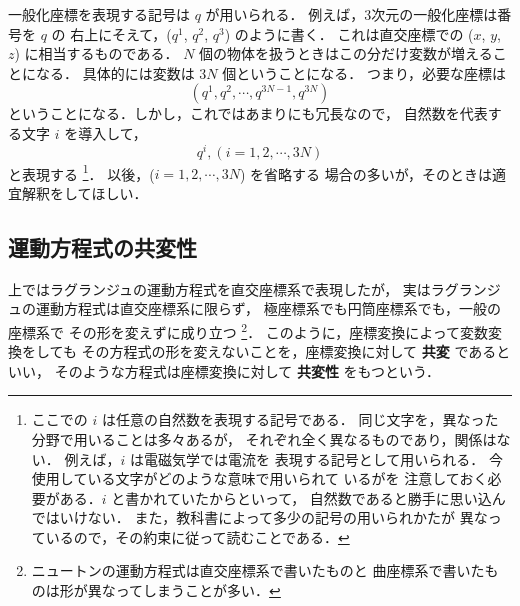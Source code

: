             一般化座標を表現する記号は $q$ が用いられる．
            例えば，3次元の一般化座標は番号を $q$ の
            右上にそえて，($q^{1}$, $q^{2}$, $q^{3}$) のように書く．
            これは直交座標での ($x$, $y$, $z$) に相当するものである．
            $N$ 個の物体を扱うときはこの分だけ変数が増えることになる．
            具体的には変数は $3N$ 個ということになる．
            つまり，必要な座標は
            \begin{equation*}
                (q^{1}, q^{2}, \cdots , q^{3N-1}, q^{3N})
            \end{equation*}
            ということになる．しかし，これではあまりにも冗長なので，
            自然数を代表する文字 $i$ を導入して，
            \begin{equation*}
                q^{i} , (i=1, 2, \cdots, 3N)
            \end{equation*}
            と表現する
                \footnote{
                    ここでの $i$ は任意の自然数を表現する記号である．
                    同じ文字を，異なった分野で用いることは多々あるが，
                    それぞれ全く異なるものであり，関係はない．
                    例えば，$i$ は電磁気学では電流を
                    表現する記号として用いられる．
                    今使用している文字がどのような意味で用いられて
                    いるがを
                    注意しておく必要がある．$i$ と書かれていたからといって，
                    自然数であると勝手に思い込んではいけない．
                    また，教科書によって多少の記号の用いられかたが
                    異なっているので，その約束に従って読むことである．
                }．
            以後，($i=1, 2, \cdots, 3N$) を省略する
            場合の多いが，そのときは適宜解釈をしてほしい．

        \subsection{運動方程式の共変性}
            上ではラグランジュの運動方程式を直交座標系で表現したが，
            実はラグランジュの運動方程式は直交座標系に限らず，
            極座標系でも円筒座標系でも，一般の座標系で
            その形を変えずに成り立つ
                \footnote{
                    ニュートンの運動方程式は直交座標系で書いたものと
                    曲座標系で書いたものは形が異なってしまうことが多い．
                }．
            このように，座標変換によって変数変換をしても
            その方程式の形を変えないことを，座標変換に対して \textbf{共変} であるといい，
            そのような方程式は座標変換に対して \textbf{共変性} をもつという．

